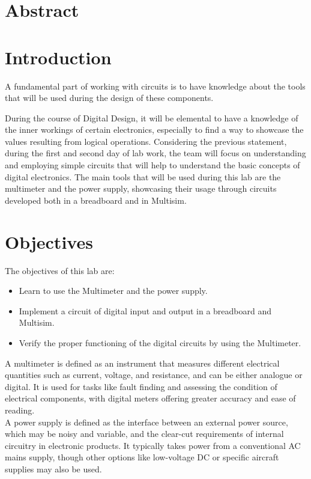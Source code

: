 \documentclass[12pt]{article}  %
\begin{document}
\section{Abstract} %

\section{Introduction} %
A fundamental part of working with circuits is to have knowledge about the tools that will be used during the design of these components.

During the course of Digital Design, it will be elemental to have a knowledge of the inner workings of certain electronics, 
especially to find a way to showcase the values resulting from logical operations. Considering the previous statement, during the first and second day of lab work, 
the team will focus on understanding and employing simple circuits that will help to understand the basic concepts of digital electronics. 
The main tools that will be used during this lab are the multimeter and the power supply, showcasing their usage through circuits developed both in a breadboard and in Multisim.
\section{Objectives} %
The objectives of this lab are:
\begin{itemize}
  \item Learn to use the Multimeter and the power supply.
  \item Implement a circuit of digital input and output in a breadboard and Multisim.
  \item Verify the proper functioning of the digital circuits by using the Multimeter.
\end{itemize}
A multimeter is defined as an instrument that measures different electrical quantities such as current, voltage, and resistance, and can be either analogue or digital. It is used for tasks like fault finding and assessing the condition of electrical components, with digital meters offering greater accuracy and ease of reading. \cite{SDMultimeter}
\\A power supply is defined as the interface between an external power source, which may be noisy and variable, and the clear-cut requirements of internal circuitry in electronic products. It typically takes power from a conventional AC mains supply, though other options like low-voltage DC or specific aircraft supplies may also be used. \cite{SDPowerSupply}
\end{document}
